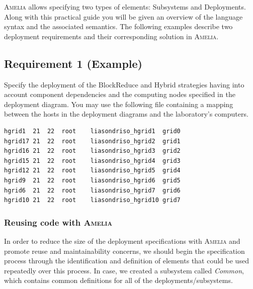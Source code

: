 \documentclass{article}
\newcommand\amelia[0]{\textsc{Amelia}}
\begin{document}
\amelia{} allows specifying two types of elements: Subsystems and Deployments. Along with this
practical guide you will be given an overview of the language syntax and the associated semantics. The following examples describe two deployment requirements and their corresponding solution in \amelia{}.

\subsection{Requirement 1 (Example)}
\label{subsect:apx-amelia-example-1}

Specify the deployment of the BlockReduce and Hybrid strategies having into account component dependencies and the computing nodes specified in the deployment diagram. You may use the following file containing a mapping between the hosts in the deployment diagrams and the laboratory's computers. \\

\begin{lstlisting}[style=common,caption=hosts.txt]
hgrid1	21	22	root	liasondriso_hgrid1	grid0
hgrid17	21	22	root	liasondriso_hgrid2	grid1
hgrid16	21	22	root	liasondriso_hgrid3	grid2
hgrid15	21	22	root	liasondriso_hgrid4	grid3
hgrid12	21	22	root	liasondriso_hgrid5	grid4
hgrid9	21	22	root	liasondriso_hgrid6	grid5
hgrid6	21	22	root	liasondriso_hgrid7	grid6
hgrid10	21	22	root	liasondriso_hgrid10	grid7
\end{lstlisting}




\subsubsection{Reusing code with \amelia{}}

In order to reduce the size of the deployment specifications with \amelia{} and promote reuse and maintainability concerns, we should begin the specification process through the identification and definition of elements that could be used repeatedly over this process. In case, we created a subsystem called \textit{Common}, which contains common definitions for all of the deployments/subsystems. \\   
\end{document}
